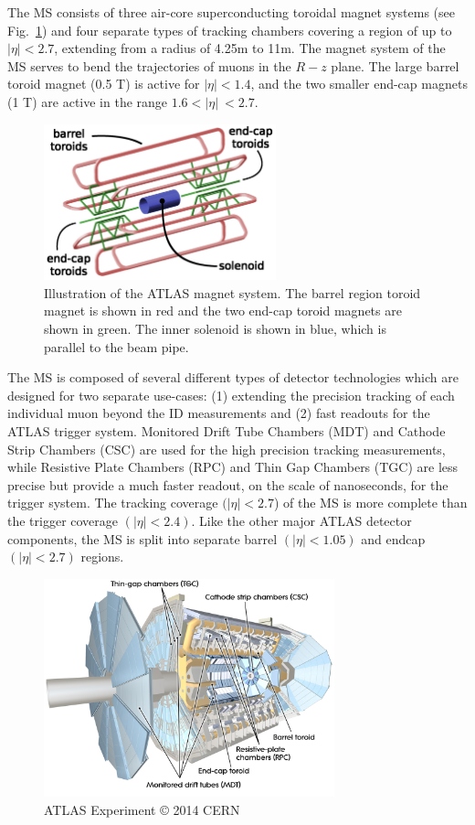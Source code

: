 The MS consists of three air-core superconducting toroidal magnet systems (see Fig.~\ref{fig:ATLAS_magnet_system}) and four separate types of tracking chambers covering a region of up to $|\eta| < 2.7$, extending from a radius of 4.25m to 11m.
The magnet system of the MS serves to bend the trajectories of muons in the $R-z$ plane.
The large barrel toroid magnet (0.5 T) is active for $|\eta| < 1.4$, and the two smaller end-cap magnets (1 T) are active in the range $1.6 < |\eta|\ < 2.7$.

\begin{figure}
	\centering
	\includegraphics[width=0.6\textwidth]{magnet_systems}
	\caption{Illustration of the ATLAS magnet system. \cite{CERN-LHCC-97-018}
	The barrel region toroid magnet is shown in red and the two end-cap toroid magnets are shown in green. The inner solenoid is shown in blue, which is parallel to the beam pipe.}
	\label{fig:ATLAS_magnet_system}
\end{figure}

The MS is composed of several different types of detector technologies which are designed for two separate use-cases: (1) extending the precision tracking of each individual muon beyond the ID measurements and (2) fast readouts for the ATLAS trigger system.
Monitored Drift Tube Chambers (MDT) and Cathode Strip Chambers (CSC) are used for the high precision tracking measurements, while Resistive Plate Chambers (RPC) and Thin Gap Chambers (TGC) are less precise but provide a much faster readout, on the scale of nanoseconds, for the trigger system.
The tracking coverage $(|\eta| < 2.7$) of the MS is more complete than the trigger coverage $(|\eta| < 2.4)$.
Like the other major ATLAS detector components, the MS is split into separate barrel $(|\eta| < 1.05)$ and endcap $(|\eta| < 2.7)$ regions.

\begin{figure}
	\centering
	\includegraphics[width=0.75\textwidth]{muon_subsystem}
	\caption{ATLAS Experiment © 2014 CERN}
\end{figure}

